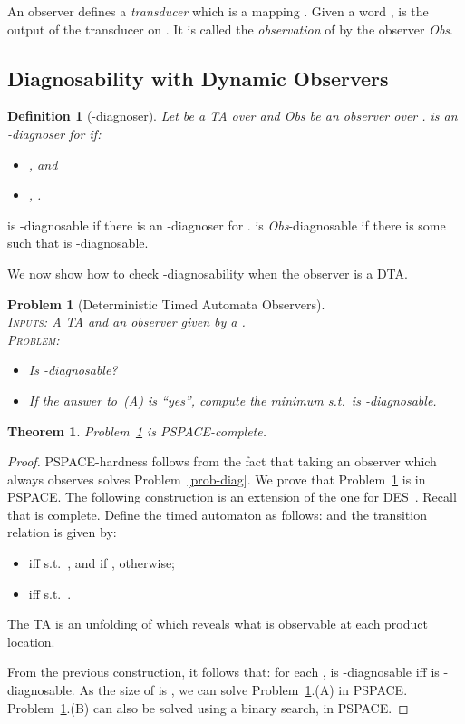 \documentclass[letterpaper,10pt,conference]{ieeeconf}  \IEEEoverridecommandlockouts                              \overrideIEEEmargins
\def\st{{s.t.}~}
\newtheorem{prob}{Problem}  \newtheorem{definition}{Definition}
\newtheorem{theorem}{Theorem}
\def\endef{\ifmmode\squareforged\else{\unskip\nobreak\hfil
\penalty50\hskip1em\null\nobreak\hfil
\parfillskip=0pt\finalhyphendemerits=0\endgraf}\fi}
\def\obs{\textit{Obs}\xspace}
\begin{document}
\noindent An observer defines a {\em transducer} which is a mapping
. Given a word
,  is the out\-put of the transducer on .  It is
called the \emph{observation} of  by the observer \obs.

\subsection{Diagnosability with Dynamic Observers}
\begin{definition}[-diagnoser] \label{def-obsk-diag}
  Let  be a TA over  and \obs be an observer
  over .  is an
  \emph{-diagnoser} for  if:
  \begin{itemize}
  \item ,
     and
  \item ,
    . \endef
  \end{itemize}
\end{definition}
 is -diagnosable if there is an
-diagnoser for .  is \obs-diagnosable if there is
some  such that  is -diagnosable.

We now show how to check -diagnosability when the observer
 is a DTA.
\begin{prob}[Deterministic Timed Automata Observers] \label{prob-dynamic-ta} \mbox{} \\
  \textsc{Inputs:} A TA  and
  an observer given by a \dta
  . \\
  \textsc{Problem:}
  \begin{itemize}
  \item[(A)] Is  -diagnosable?
  \item[(B)] If the answer to~(A) is ``yes'', compute the minimum 
    \st  is -diagnosable.
  \end{itemize}
\end{prob}

\begin{theorem}
  Problem~\ref{prob-dynamic-ta} is PSPACE-complete.
\end{theorem}

\begin{proof}
  PSPACE-hardness follows from the fact that taking an observer which
  always observes  solves
  Problem~\ref{prob-diag}.  We prove that
  Problem~\ref{prob-dynamic-ta} is in PSPACE.  The following
  construction is an extension of the one for DES~\cite{cassez-fi-08}.
  Recall that  is complete.  Define the timed automaton  as follows:
   and the transition relation
   is given by:
\begin{itemize}
\item  iff  \st ,
   and  if ,  otherwise;
\item  iff 
   \st .
\end{itemize}
The TA  is an unfolding of  which reveals what is
observable at each product location.

From the previous construction, it follows that: for each ,  is -diagnosable iff  is
-diagnosable.  As the size of  is
, we can solve Problem~\ref{prob-dynamic-ta}.(A) in
PSPACE.  Problem~\ref{prob-dynamic-ta}.(B) can also be solved using a
binary search, in PSPACE.
\end{proof}
\end{document}
